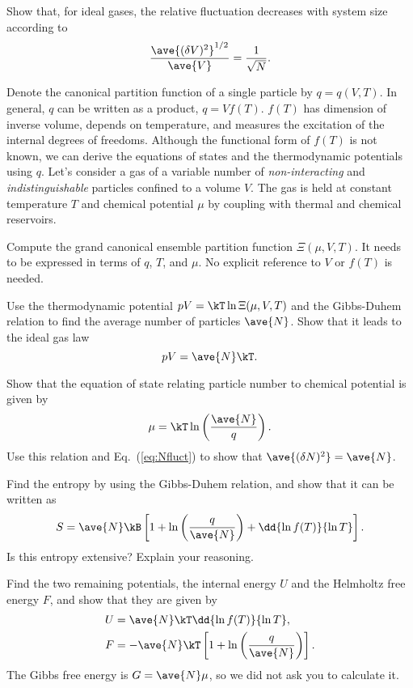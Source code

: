 \smallskip\subp
Show that, for ideal gases, the relative fluctuation decreases with system size according to 
$$ \frac{\ave{(\delta V)^2}^{1/2}}{\ave{V}} = \frac{1}{\sqrt{N}} . $$

\bigskip
{}
Denote the canonical partition function of a single particle by $q=q(V,T)$.
In general, $q$ can be written as a product, $q=V f(T)$.
$f(T)$ has dimension of inverse volume, depends on temperature,
and measures the excitation of the internal degrees of freedoms.
Although the functional form of $f(T)$ is not known,
we can derive the equations of states and the thermodynamic potentials using $q$.
Let's consider a gas of a variable number of {\sl non-interacting} and
{\sl indistinguishable} particles confined to a volume $V$.
The gas is held at constant temperature $T$ and chemical potential $\mu$
by coupling with thermal and chemical reservoirs.

\smallskip\subp
Compute the grand canonical ensemble partition function $\Xi(\mu,V,T)$.
It needs to be expressed in terms of $q$, $T$, and $\mu$.
No explicit reference to $V$ or $f(T)$ is needed.

\smallskip\subp
Use the thermodynamic potential $pV = \kT \ln\Xi(\mu,V,T)$
and the Gibbs-Duhem relation to find the average number of particles $\ave{N}$.
Show that it leads to the ideal gas law
$$ pV = \ave{N} \kT .$$

\smallskip\subp
Show that the equation of state relating particle number to chemical potential is given by
$$ \mu = \kT \ln\left(\frac{\ave{N}}{q}\right) .$$
Use this relation and Eq.~(\ref{eq:Nfluct}) to show that $\ave{(\delta N)^2} = \ave{N}$.

\smallskip\subp
Find the entropy by using the Gibbs-Duhem relation, and show that it can be written as
$$ S = \ave{N} \kB\left[ 1 + \ln \left(\frac{q}{\ave{N}}\right) + \dd{\ln f(T)}{\ln T} \right] .$$
Is this entropy extensive? Explain your reasoning.

\smallskip\subp
Find the two remaining potentials, the internal energy $U$ and the Helmholtz free energy $F$,
and show that they are given by
\begin{align*}
U &= \ave{N} \kT \dd{\ln f(T)}{\ln T} , \\
F &= -\ave{N} \kT \left[1 +  \ln \left(\frac{q}{\ave{N}}\right) \right].
\end{align*}
The Gibbs free energy is $G = \ave{N} \mu$, so we did not ask you to calculate it.
